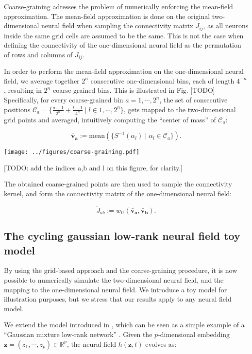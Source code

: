 \documentclass[10pt,letterpaper]{article}
\def\R{\mathbb R}
\def\Rp{\R^p}
\renewcommand{\vec}[1]{\boldsymbol{#1}}
\begin{document}
Coarse-graining adresses the problem of numerically enforcing the mean-field approximation. The mean-field approximation is done on the original two-dimensional neural field when sampling the connectivity matrix $J_{ij}$, as all neurons inside the same grid cells are assumed to be the same. This is not the case when defining the connectivity of the one-dimensional neural field as the permutation of rows and columns of $J_{ij}$.

In order to perform the mean-field approximation on the one-dimensional neural field, we average together $2^n$ consecutive one-dimensional bins, each of length $4^{-n}$, resulting in $2^n$ coarse-grained bins. This is illustrated in Fig. [TODO] Specifically, for every coarse-grained bin $a=1,\cdots,2^n$, the set of consecutive positions $\mathcal{C}_a = \{\tfrac{a-1}{2^n} + \tfrac{l-1}{4^n} \;|\; l \in 1, \cdots, 2^n\}$, gets mapped to the two-dimensional grid points and averaged, intuitively computing the ``center of mass'' of $\mathcal{C}_a$:

\begin{equation*}
\vec{\bar v_a} := \textrm{mean}(\{S^{-1}(\alpha_l) \;|\; \alpha_l \in \mathcal{C}_a\}).
\end{equation*}

\texttt{[image: ../figures/coarse-graining.pdf]}

[TODO: add the indices a,b and l on this figure, for clarity.]
\endif

The obtained coarse-grained points are then used to sample the connectivity kernel, and form the connectivity matrix of the one-dimensional neural field:

\begin{equation} \label{eq:def-tilde-J}
\tilde J_{ab} := w_U(\vec{\bar v_a}, \vec{\bar v_b}).
\end{equation}

\subsection{The cycling gaussian low-rank neural field toy model}

By using the grid-based approach and the coarse-graining procedure, it is now possible to numerically simulate the two-dimensional neural field, and the mapping to the one-dimensional neural field. We introduce a toy model for illustration purposes, but we stress that our results apply to any neural field model.

We extend the model introduced in \cite{schmutz2023convergence}, which can be seen as a simple example of a ``Gaussian mixture low-rank network'' \cite{Beiran2021}. Given the $p$-dimensional embedding $\vec z = (z_1, \cdots, z_p) \in \Rp$, the neural field $h(\vec z, t)$ evolves as:
\end{document}
